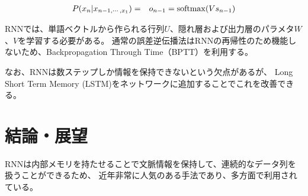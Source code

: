 \documentclass{jsarticle}
\begin{document}
\begin{eqnarray}
  \label{eq:eq8}
  P(x_n|x_{n-1,\cdots,x_1}) &=& o_{n-1} = {\rm softmax}(Vs_{n-1}) 
\end{eqnarray}

RNNでは、単語ベクトルから作られる行列$U$、隠れ層および出力層のパラメタ$W$、$V$を学習する必要がある。
通常の誤差逆伝播法はRNNの再帰性のため機能しないため、Backpropagation Through Time（BPTT）を利用する。

なお、RNNは数ステップしか情報を保持できないという欠点があるが、
Long Short Term Memory (LSTM)をネットワークに追加することでこれを改善できる。

\section{結論・展望}
RNNは内部メモリを持たせることで文脈情報を保持して、連続的なデータ列を扱うことができるため、
近年非常に人気のある手法であり、多方面で利用されている。
\end{document}
